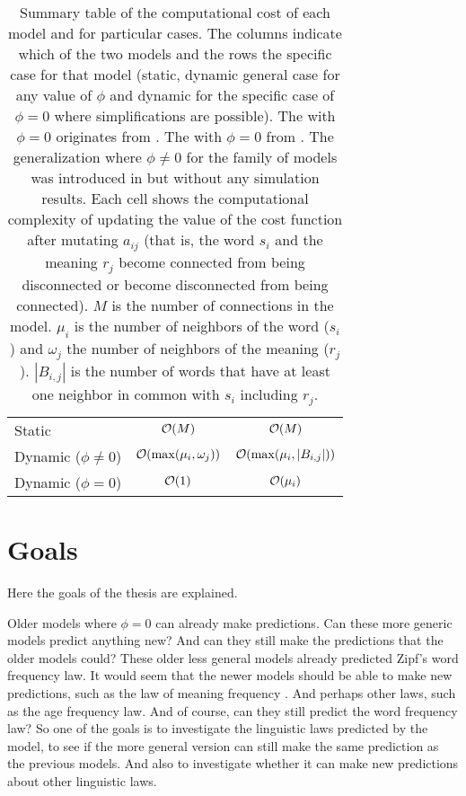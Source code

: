 \begin{table}
  \centering
  \begin{adjustbox}{max width=\textwidth}
    \begin{tabular}{lcc}
      \toprule
                             & \Firstmodel{} & \Secondmodel{} \\
      \midrule
      Static                 & $\mathcal{O}(M)$                    & $\mathcal{O}(M)$                   \\
      Dynamic ($\phi\neq 0$) & $\mathcal{O}(\max(\mu_i,\omega_j))$ & $\mathcal{O}(\max(\mu_i,|B_{i,j}|))$ \\
      Dynamic ($\phi=0$)     & $\mathcal{O}(1)$                   & $\mathcal{O}(\mu_i)$                \\
      \bottomrule
    \end{tabular}
  \end{adjustbox}
    \caption{
      Summary table of the computational cost of each model and for particular cases.
      The columns indicate which of the two models and the rows the specific case for that model (static, dynamic general case for any value of $\phi$ and dynamic for the specific case of $\phi=0$ where simplifications are possible).
      The \firstmodel{} with $\phi=0$ originates from \cite{Ferrer2005a}.
      The \secondmodel{} with $\phi=0$ from \cite{Ferrer2003a}.
      The generalization where $\phi \neq 0$ for the family of models was introduced in \cite{Ferrer2018a} but without any simulation results.
      Each cell shows the computational complexity of updating the value of the cost function after mutating $a_{ij}$ (that is, the word $s_i$ and the meaning $r_j$ become connected from being disconnected or become disconnected from being connected).
      $M$ is the number of connections in the model.
      $\mu_i$ is the number of neighbors of the word ($s_i$) and $\omega_j$ the number of neighbors of the meaning ($r_j$).
      $|B_{i,j}|$ is the number of words that have at least one neighbor in common with $s_i$ including $r_j$.
    }
  \label{tab:summary-computational}
\end{table}

\section{Goals}
\label{sec:introduction_goals}

Here the goals of the thesis are explained.

Older models \cite{Ferrer2003a} \cite{Ferrer2005a} where $\phi=0$ can already make predictions.
Can these more generic models predict anything new? And can they still make the predictions  that the older models could?
These older less general models already predicted Zipf's word frequency law.
It would seem that the newer models should be able to make new predictions, such as the law of meaning frequency \cite{Ferrer2018a}.
And perhaps other laws, such as the age frequency law.
And of course, can they still predict the word frequency law?
So one of the goals is to investigate the linguistic laws predicted by the model, to see if the more general version can still make the same prediction as the previous models.
And also to investigate whether it can make new predictions about other linguistic laws.

